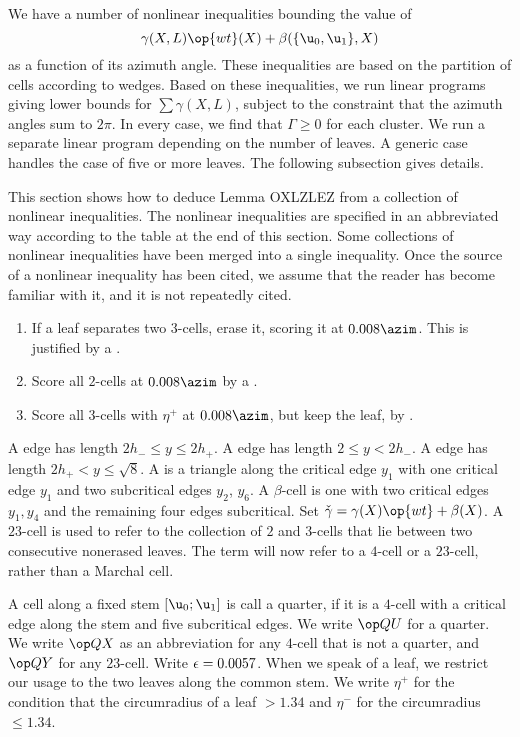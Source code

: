 We have a number of nonlinear inequalities bounding the value of 
\[
\gamma(X,L) \op{wt}(X) + \beta(\{\u_0,\u_1\},X)
\]
 as a function
of its azimuth angle.  These inequalities are based on the partition of cells according to wedges.
Based on these inequalities,
we run linear programs giving lower bounds for $\sum \gamma(X,L)$, subject to the constraint
that the azimuth angles sum to $2\pi$.  In every case, we find that $\Gamma\ge0$ for each cluster.
We run a separate linear program depending on the number of leaves.  A generic case handles
the case of five or more leaves.
The following subsection gives details.



This section shows how to deduce Lemma OXLZLEZ from a collection of nonlinear inequalities.
The nonlinear inequalities are specified in an abbreviated way according to the table at the end of this section.
Some collections of  nonlinear inequalities have been merged into a single inequality.
Once the source of a nonlinear inequality has been cited, we assume that the reader has become
familiar with it, and it is not repeatedly cited.

\begin{remark}[preparation]
\begin{enumerate}
\item If a leaf separates two $3$-cells, erase it, scoring it at $0.008\azim$.  This is justified by
a .
\item Score all $2$-cells at $0.008\azim$ by a .
\item Score all $3$-cells with $\eta ^+$ at $0.008\azim$, but keep the leaf, by .
\end{enumerate}
\end{remark}

\begin{definition}
A  edge has length $2h_-\le y\le 2h_+$.  A  edge has length $2\le y< 2h_-$.
A  edge has length $2h_+<y\le\sqrt8$.
A  is a triangle along the critical edge $y_1$ with one critical edge $y_1$ and two
subcritical edges $y_2$, $y_6$.
A $\beta$-cell is one with two critical edges $y_1,y_4$ and the remaining four edges subcritical.
Set $\gg = \gamma(X)\op{wt} + \beta(X)$.
A $23$-cell is used to refer to the collection of $2$ and $3$-cells that lie between two consecutive nonerased leaves.  The term  will now refer to a $4$-cell or a $23$-cell,
rather than a Marchal cell.

A cell along a fixed stem $[\u_0;\u_1]$ is call a quarter, if it
 is a $4$-cell with a critical edge along the stem and five subcritical edges.
We write $\QU$ for a quarter.
We write $\QX$ as an abbreviation for any $4$-cell that is not a quarter,
and $\QY$ for any $23$-cell. Write $\epsilon=0.0057$.
When we speak of a leaf, we restrict our usage to the two leaves along the common stem.
We write $\eta^+$ for the condition that the circumradius of a leaf $>1.34$ and
$\eta^-$ for the circumradius $\le 1.34$.
\end{definition}

